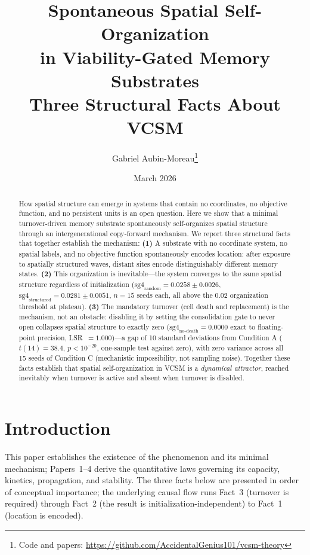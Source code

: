 \documentclass[11pt,twocolumn]{article}
\title{\textbf{Spontaneous Spatial Self-Organization\\
in Viability-Gated Memory Substrates}\\[0.5em]
\large Three Structural Facts About VCSM}
\author{Gabriel Aubin-Moreau\thanks{Code and papers: \url{https://github.com/AccidentalGenius101/vcsm-theory}}}
\date{March 2026}
\begin{document}
\maketitle

\begin{abstract}
How spatial structure can emerge in systems that contain no coordinates, no
objective function, and no persistent units is an open question.
Here we show that a minimal turnover-driven memory substrate spontaneously
self-organizes spatial structure through an intergenerational copy-forward mechanism.
We report three structural facts that together establish the mechanism:
\textbf{(1)} A substrate with no coordinate system, no spatial labels, and no
objective function spontaneously encodes location: after exposure to spatially
structured waves, distant sites encode distinguishably different memory states.
\textbf{(2)} This organization is inevitable---the system converges to the same
spatial structure regardless of initialization
($\text{sg4}_\text{random} = 0.0258 \pm 0.0026$,
$\text{sg4}_\text{structured} = 0.0281 \pm 0.0051$, $n=15$ seeds each,
all above the 0.02 organization threshold at plateau).
\textbf{(3)} The mandatory turnover (cell death and replacement) is the mechanism,
not an obstacle: disabling it by setting the consolidation gate to never open
collapses spatial structure to exactly zero
($\text{sg4}_\text{no-death} = 0.0000$ exact to floating-point precision,
LSR~$= 1.000$)---a gap of
10 standard deviations from Condition A ($t(14) = 38.4$, $p < 10^{-20}$,
one-sample test against zero), with zero variance across all 15 seeds of
Condition C (mechanistic impossibility, not sampling noise).
Together these facts establish that spatial self-organization in VCSM is a
\emph{dynamical attractor}, reached inevitably when turnover is active and
absent when turnover is disabled.
\end{abstract}

\section{Introduction}

This paper establishes the existence of the phenomenon and its minimal mechanism;
Papers~1--4 derive the quantitative laws governing its capacity, kinetics,
propagation, and stability.
The three facts below are presented in order of conceptual importance;
the underlying causal flow runs Fact~3 (turnover is required) through
Fact~2 (the result is initialization-independent) to Fact~1 (location is encoded).
\end{document}
